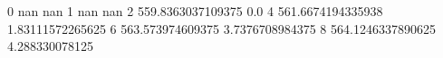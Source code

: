 0 nan nan
1 nan nan
2 559.8363037109375 0.0
4 561.6674194335938 1.83111572265625
6 563.573974609375 3.7376708984375
8 564.1246337890625 4.288330078125
